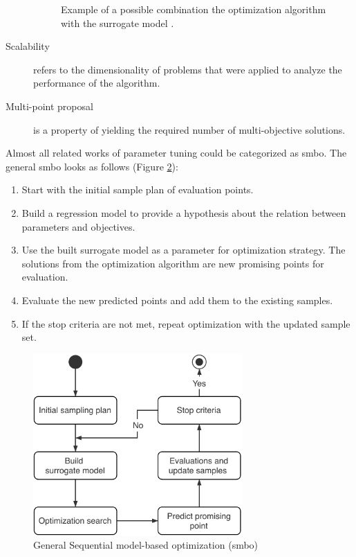 \begin{description}
\begin{figure}[h]
                    \caption[Example of a possible combination the optimization algorithm with the surrogate model.]{Example of a possible combination the optimization algorithm with the surrogate model \cite{FigueiraA14}. }
                    \label{fig:surr_opt_architecture}    
                \end{figure}

            \item[Scalability] refers to the dimensionality of problems that were applied to analyze the performance of the algorithm.
            \item[Multi-point proposal] is a property of yielding the required number of multi-objective solutions.
        \end{description}



        Almost all related works of parameter tuning could be categorized as \gls{smbo}\cite{JonesSW98}.
        The general \gls{smbo} looks as follows (Figure \ref{fig:sequential_mbo}):
        \begin{enumerate}
            \item Start with the initial sample plan of evaluation points.
            \item Build a regression model to provide a hypothesis about the relation between parameters and objectives.
            \item Use the built surrogate model as a parameter for optimization strategy. The solutions from the optimization algorithm are new promising points for evaluation.
            \item Evaluate the new predicted points and add them to the existing samples.
            \item If the stop criteria are not met, repeat optimization with the updated sample set.
        \end{enumerate}

                                                                                                            
        \begin{figure}[h]
            \centering 
            \includegraphics[width=8cm]{content/images/utility/sequential_mbo}
            \caption[General Sequential model-based optimization]{General Sequential model-based optimization (\Gls{smbo})} 
            \label{fig:sequential_mbo} 
        \end{figure}

